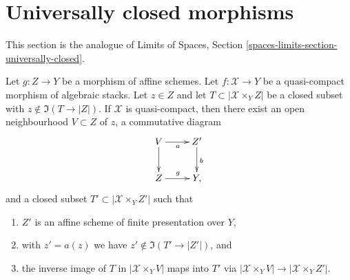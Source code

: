 \section{Universally closed morphisms}
\label{section-universally-closed}

\noindent
This section is the analogue of Limits of Spaces, Section
\ref{spaces-limits-section-universally-closed}.

\begin{lemma}
\label{lemma-separate}
Let $g : Z \to Y$ be a morphism of affine schemes.
Let $f : \mathcal{X} \to Y$ be a quasi-compact morphism of algebraic stacks.
Let $z \in Z$ and let $T \subset |\mathcal{X} \times_Y Z|$
be a closed subset with $z \not \in \Im(T \to |Z|)$.
If $\mathcal{X}$ is quasi-compact, then there exist
an open neighbourhood $V \subset Z$ of $z$,
a commutative diagram
$$
\xymatrix{
V \ar[d] \ar[r]_a & Z' \ar[d]^b \\
Z \ar[r]^g & Y,
}
$$
and a closed subset $T' \subset |\mathcal{X} \times_Y Z'|$ such that
\begin{enumerate}
\item $Z'$ is an affine scheme of finite presentation over $Y$,
\item with $z' = a(z)$ we have $z' \not \in \Im(T' \to |Z'|)$, and
\item the inverse image of $T$ in $|\mathcal{X} \times_Y V|$
maps into $T'$ via $|\mathcal{X} \times_Y V| \to |\mathcal{X} \times_Y Z'|$.
\end{enumerate}
\end{lemma}

